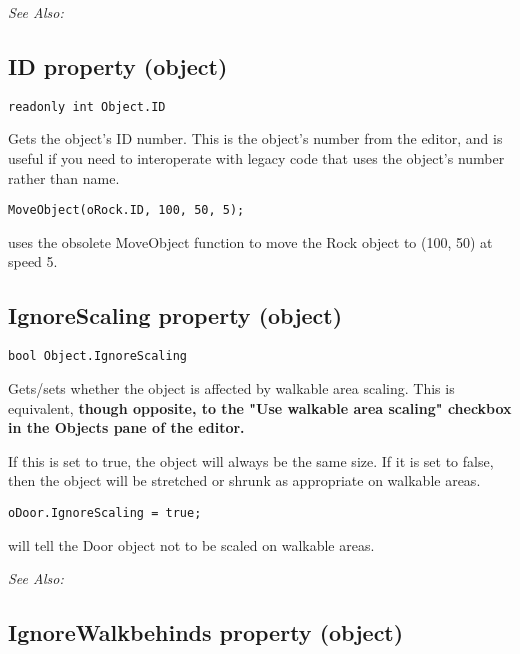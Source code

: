 \it{See Also:} 


\subsection{ID property (object)}\label{Object.ID}%

\begin{verbatim}
readonly int Object.ID
\end{verbatim}
Gets the object's ID number. This is the object's number from the editor, and is
useful if you need to interoperate with legacy code that uses the object's number
rather than name.

\begin{verbatim}
MoveObject(oRock.ID, 100, 50, 5);
\end{verbatim}
uses the obsolete MoveObject function to move the Rock object to (100, 50) at speed 5.


\subsection{IgnoreScaling property (object)}\label{Object.IgnoreScaling}%

\begin{verbatim}
bool Object.IgnoreScaling
\end{verbatim}
Gets/sets whether the object is affected by walkable area scaling. This is equivalent,
\bf{though opposite}, to the "Use walkable area scaling" checkbox in the Objects pane of the editor.

If this is set to true, the object will always be the same size. If it is set to false, then
the object will be stretched or shrunk as appropriate on walkable areas.

\begin{verbatim}
oDoor.IgnoreScaling = true;
\end{verbatim}
will tell the Door object not to be scaled on walkable areas.

\it{See Also:} 


\subsection{IgnoreWalkbehinds property (object)}\label{Object.IgnoreWalkbehinds}%

